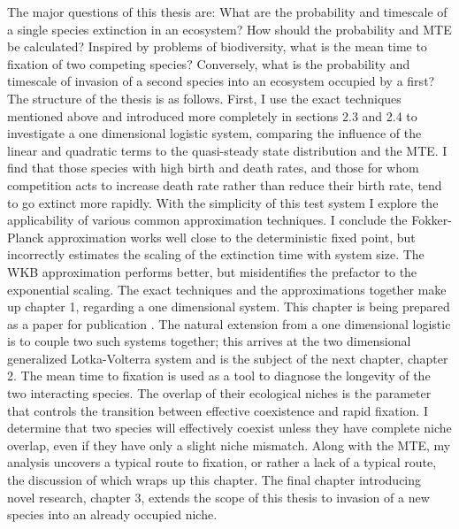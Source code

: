 \iffalse
The major questions of this thesis are: What are the probability and timescale of a single species extinction in an ecosystem? How should the probability and MTE be calculated? Inspired by problems of biodiversity, what is the mean time to fixation of two competing species? Conversely, what is the probability and timescale of invasion of a second species into an ecosystem occupied by a first? 
The structure of the thesis is as follows. 
First, I use the exact techniques mentioned above and introduced more completely in sections 2.3 and 2.4 to investigate a one dimensional logistic system, comparing the influence of the linear and quadratic terms to the quasi-steady state distribution and the MTE. %
I find that those species with high birth and death rates, and those for whom competition acts to increase death rate rather than reduce their birth rate, tend to go extinct more rapidly. %
With the simplicity of this test system I explore the applicability of various common approximation techniques. 
I conclude the Fokker-Planck approximation works well close to the deterministic fixed point, but incorrectly estimates the scaling of the extinction time with system size. The WKB approximation performs better, but misidentifies the prefactor to the exponential scaling. %
The exact techniques and the approximations together make up chapter 1, regarding a one dimensional system. %
This chapter is being prepared as a paper for publication \cite{Badali2018a}. 
The natural extension from a one dimensional logistic is to couple two such systems together; this arrives at the two dimensional generalized Lotka-Volterra system and is the subject of the next chapter, chapter 2. %
The mean time to fixation is used as a tool to diagnose the longevity of the two interacting species. 
The overlap of their ecological niches is the parameter that controls the transition between effective coexistence and rapid fixation. 
I determine that two species will effectively coexist unless they have complete niche overlap, even if they have only a slight niche mismatch. %
Along with the MTE, my analysis uncovers a typical route to fixation, or rather a lack of a typical route, the discussion of which wraps up this chapter. %
The final chapter introducing novel research, chapter 3, extends the scope of this thesis to invasion of a new species into an already occupied niche. %
